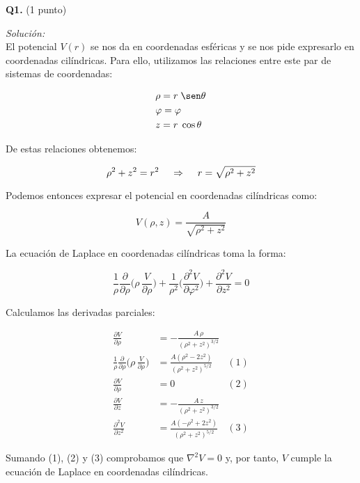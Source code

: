 \textbf{Q1.} (1 punto)


\vspace{20px}
\textit{Solución:}
\\

El potencial $V(r)$ se nos da en coordenadas esféricas y se nos pide expresarlo en coordenadas cilíndricas. Para ello,
utilizamos las relaciones entre este par de sistemas de coordenadas:

\begin{align*}
    & \rho = r \; \sen\theta \\
    & \varphi = \varphi \\
    & z = r \; \cos\theta
\end{align*}

De estas relaciones obtenemos:

\begin{equation*}
    \rho^2 + z^2 = r^2 \hspace{12px} \Rightarrow  \hspace{12px} r = \sqrt{ \rho^2 + z^2}
\end{equation*}

Podemos entonces expresar el potencial en coordenadas cilíndricas como:

\begin{equation*}
    V(\rho, z) = \frac{A}{\sqrt{ \rho^2 + z^2}}
\end{equation*}

La ecuación de Laplace en coordenadas cilíndricas toma la forma:

\begin{equation*}
    \frac{1}{\rho} \frac{\partial}{\partial \rho} \biggl( \rho \, \frac{V}{\partial \rho} \biggr)
    +
    \frac{1}{\rho^2}  \biggl( \frac{\partial^2 V}{\partial \varphi^2} \biggr)
    +
    \frac{\partial^2 V}{\partial z^2} = 0
\end{equation*}

Calculamos las derivadas parciales:

\begin{align*}
    \frac{\partial V}{\partial \rho}   & = - \frac{A \, \rho}{(\rho^2 + z^2)^{3/2}} & \\[12px]
    \frac{1}{\rho} \frac{\partial}{\partial \rho}  \biggl( \rho \, \frac{V}{\partial \rho} \biggr)  & =
    \frac{A ( \rho^2 - 2z^2)}{(\rho^2 + z^2)^{5/2}} & (1) \\[12px]
    \frac{\partial V}{\partial \rho} &= 0 & (2) \\[12px]
    \frac{\partial V}{\partial z} &= - \frac{A \, z}{(\rho^2 + z^2)^{3/2}} &  \\[12px]
    \frac{\partial^2 V}{\partial z^2} &= \frac{A (- \rho^2 + 2z^2)}{(\rho^2 + z^2)^{5/2}} & (3)
\end{align*}

Sumando (1), (2) y (3) comprobamos que $\nabla^2 V = 0$ y, por tanto, $V$ cumple la ecuación de Laplace en coordenadas cilíndricas.




